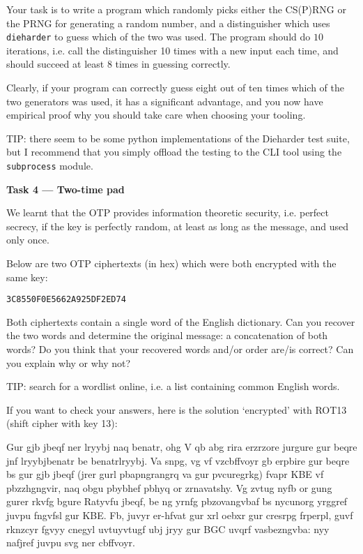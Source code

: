 \documentclass{practice}
\begin{document}
Your task is to write a program which randomly picks either the CS(P)RNG or the PRNG for generating a random number, and a distinguisher which uses \texttt{dieharder} to guess which of the two was used.
The program should do $10$ iterations, i.e. call the distinguisher 10 times with a new input each time, and should succeed at least $8$ times in guessing correctly.

Clearly, if your program can correctly guess eight out of ten times which of the two generators was used, it has a significant advantage, and you now have empirical proof why you should take care when choosing your tooling.

TIP: there seem to be some python implementations of the Dieharder test suite, but I recommend that you simply offload the testing to the CLI tool using the \texttt{subprocess}\footnotemark{} module.

\textbf{Task 4 --- Two-time pad}

We learnt that the OTP provides information theoretic security, i.e. perfect secrecy, if the key is perfectly random, at least as long as the message, and used only once.

Below are two OTP ciphertexts (in hex) which were both encrypted with the same key:
\begin{center}
    \texttt{3C8550F0E566}\hspace*{5em}\texttt{2A925DF2ED74}
\end{center}

Both ciphertexts contain a single word of the English dictionary.
Can you recover the two words and determine the original message: a concatenation of both words?
Do you think that your recovered words and/or order are/is correct?
Can you explain why or why not?

TIP: search for a wordlist online, i.e. a list containing common English words.

If you want to check your answers, here is the solution `encrypted' with ROT13 (shift cipher with key 13):

Gur gjb jbeqf ner lryybj naq benatr, ohg V qb abg rira erzrzore jurgure gur beqre jnf lryybjbenatr be benatrlryybj. Va snpg, vg vf vzcbffvoyr gb erpbire gur beqre bs gur gjb jbeqf (jrer gurl pbapngrangrq va gur pvcuregrkg) fvapr KBE vf pbzzhgngvir, naq obgu pbybhef pbhyq or zrnavatshy. Vg zvtug nyfb or gung gurer rkvfg bgure Ratyvfu jbeqf, be ng yrnfg pbzovangvbaf bs nycunorg yrggref juvpu fngvfsl gur KBE. Fb, juvyr er-hfvat gur xrl oebxr gur cresrpg frperpl, guvf rknzcyr fgvyy cnegyl uvtuyvtugf ubj jryy gur BGC uvqrf vasbezngvba: nyy nafjref juvpu svg ner cbffvoyr.
\end{document}
